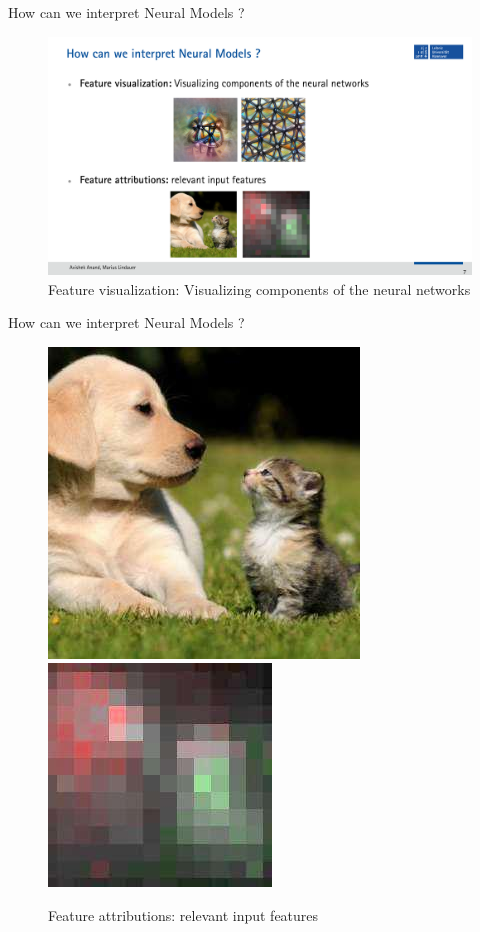 \documentclass[11pt,compress,t,notes=noshow, aspectratio=169, xcolor=table]{beamer}
\begin{document}
\begin{frame}[c]{How can we interpret Neural Models ?}

	\begin{figure}
	\centering
\hfill

  \includegraphics[width=0.6\linewidth]{figure/iml-grad-vis.pdf}
  
  \caption{Feature visualization: Visualizing components of the neural networks}

\end{figure}
\end{frame}


\begin{frame}[c]{How can we interpret Neural Models ?}

\begin{figure}[h]
	\centering
	\includegraphics[width=0.3\linewidth]{figure/img145.jpg}
	\includegraphics[width=0.3\linewidth]{figure/img149.jpg}
	\caption{Feature attributions: relevant input features}
\end{figure}
\end{frame}

\endlecture
\end{document}
